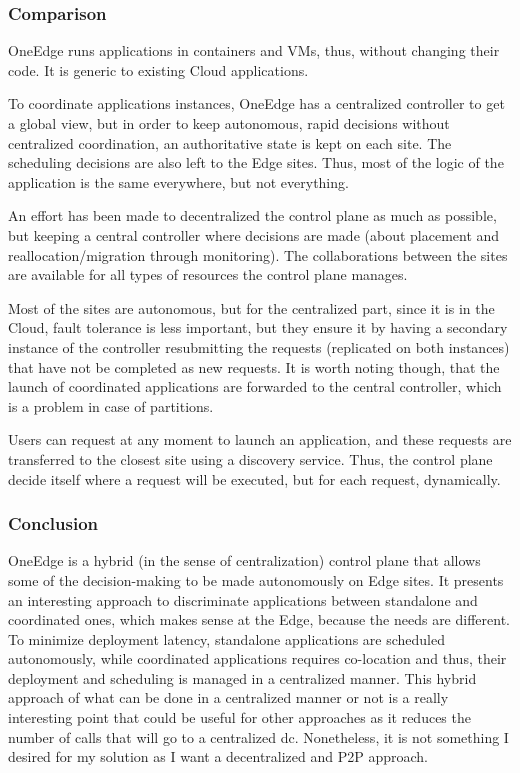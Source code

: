\subsubsection*{Comparison}

OneEdge runs applications in containers and VMs, thus, without
changing their code. It is generic to existing Cloud
applications.

To coordinate applications instances, OneEdge has a centralized
controller to get a global view, but in order to keep autonomous,
rapid decisions without centralized coordination, an authoritative
state is kept on each site. The scheduling decisions are also left to
the Edge sites. Thus, most of the logic of the application is the same
everywhere, but not everything.


An effort has been made to decentralized the control plane as much as
possible, but keeping a central controller where decisions are made
(about placement and reallocation/migration through monitoring). The
collaborations between the sites are available for all types of
resources the control plane manages.

Most of the sites are autonomous, but for the centralized part, since
it is in the Cloud, fault tolerance is less important, but they ensure
it by having a secondary instance of the controller resubmitting the
requests (replicated on both instances) that have not be completed as
new requests. It is worth noting though, that the launch of
coordinated applications are forwarded to the central controller,
which is a problem in case of partitions.

Users can request at any moment to launch an application, and these
requests are transferred to the closest site using a discovery
service. Thus, the control plane decide itself where a request will be
executed, but for each request, dynamically.


\subsubsection*{Conclusion}

OneEdge is a hybrid (in the sense of centralization) control plane
that allows some of the decision-making to be made autonomously on
Edge sites.
%
It presents an interesting approach to discriminate applications
between standalone and coordinated ones, which makes sense at the
Edge, because the needs are different.
%
To minimize deployment latency, standalone applications are scheduled
autonomously, while coordinated applications requires co-location and
thus, their deployment and scheduling is managed in a centralized
manner.
%
This hybrid approach of what can be done in a centralized manner or
not is a really interesting point that could be useful for other
approaches as it reduces the number of calls that will go to a
centralized \gls{dc}.
%
Nonetheless, it is not something I desired for my solution as I want a
decentralized and P2P approach.



